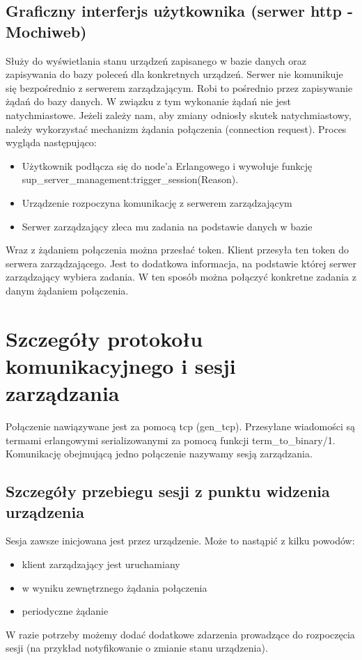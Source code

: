 \documentclass[polish,12pt]{aghthesis}
\begin{document}
\subsection{Graficzny interferjs użytkownika (serwer http - Mochiweb)}
Służy do wyświetlania stanu urządzeń zapisanego w bazie danych oraz zapisywania do bazy poleceń dla konkretnych urządzeń. Serwer nie komunikuje się bezpośrednio z serwerem zarządzającym. Robi to pośrednio przez zapisywanie żądań do bazy danych. W związku z tym wykonanie żądań nie jest natychmiastowe. Jeżeli zależy nam, aby zmiany odniosły skutek natychmiastowy, należy wykorzystać mechanizm żądania połączenia (connection request). Proces wygląda następująco:
\begin{itemize}
\item Użytkownik podłącza się do node'a Erlangowego i wywołuje funkcję sup\_server\_management:trigger\_session(Reason).
\item Urządzenie rozpoczyna komunikację z serwerem zarządzającym
\item Serwer zarządzający zleca mu zadania na podstawie danych w bazie
\end{itemize}
Wraz z żądaniem połączenia można przesłać token. Klient przesyła ten token do serwera zarządzającego. Jest to dodatkowa informacja, na podstawie której serwer zarządzający wybiera zadania. W ten sposób można połączyć konkretne zadania z danym żądaniem połączenia.

\section{Szczegóły protokołu komunikacyjnego i sesji zarządzania}
Połączenie nawiązywane jest za pomocą tcp (gen\_tcp). Przesyłane wiadomości są termami erlangowymi serializowanymi za pomocą funkcji term\_to\_binary/1. Komunikację obejmującą jedno połączenie nazywamy sesją zarządzania.

\subsection{Szczegóły przebiegu sesji z punktu widzenia urządzenia}
Sesja zawsze inicjowana jest przez urządzenie. Może to nastąpić z kilku powodów:
\begin{itemize}
\item klient zarządzający jest uruchamiany
\item w wyniku zewnętrznego żądania połączenia
\item periodyczne żądanie
\end{itemize}
W razie potrzeby możemy dodać dodatkowe zdarzenia prowadzące do rozpoczęcia sesji (na przykład notyfikowanie o zmianie stanu urządzenia).
\end{document}

